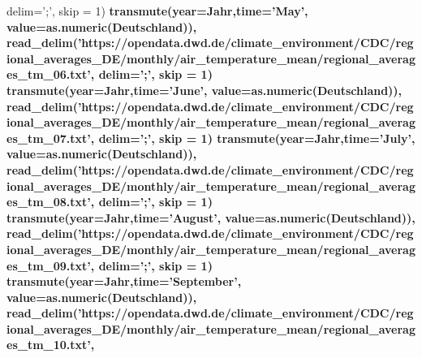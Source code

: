 \documentclass[
]{article}
\newenvironment{Shaded}{\begin{snugshade}}{\end{snugshade}}
\newcommand{\DataTypeTok}[1]{\textcolor[rgb]{0.13,0.29,0.53}{#1}}
\newcommand{\DecValTok}[1]{\textcolor[rgb]{0.00,0.00,0.81}{#1}}
\newcommand{\KeywordTok}[1]{\textcolor[rgb]{0.13,0.29,0.53}{\textbf{#1}}}
\newcommand{\NormalTok}[1]{#1}
\newcommand{\OperatorTok}[1]{\textcolor[rgb]{0.81,0.36,0.00}{\textbf{#1}}}
\newcommand{\StringTok}[1]{\textcolor[rgb]{0.31,0.60,0.02}{#1}}
\begin{document}
\begin{Shaded}
\begin{Highlighting}[]
{{{{{{{{{{               \DataTypeTok{delim=}\StringTok{';'}\NormalTok{, }\DataTypeTok{skip =} \DecValTok{1}\NormalTok{) }\OperatorTok{%
\StringTok{      }\KeywordTok{transmute}\NormalTok{(}\DataTypeTok{year=}\NormalTok{Jahr,}\DataTypeTok{time=}\StringTok{'May'}\NormalTok{, }\DataTypeTok{value=}\KeywordTok{as.numeric}\NormalTok{(Deutschland)),}
    \KeywordTok{read_delim}\NormalTok{(}\StringTok{'https://opendata.dwd.de/climate_environment/CDC/regional_averages_DE/monthly/air_temperature_mean/regional_averages_tm_06.txt'}\NormalTok{,}
               \DataTypeTok{delim=}\StringTok{';'}\NormalTok{, }\DataTypeTok{skip =} \DecValTok{1}\NormalTok{) }\OperatorTok{%
\StringTok{      }\KeywordTok{transmute}\NormalTok{(}\DataTypeTok{year=}\NormalTok{Jahr,}\DataTypeTok{time=}\StringTok{'June'}\NormalTok{, }\DataTypeTok{value=}\KeywordTok{as.numeric}\NormalTok{(Deutschland)),}
    \KeywordTok{read_delim}\NormalTok{(}\StringTok{'https://opendata.dwd.de/climate_environment/CDC/regional_averages_DE/monthly/air_temperature_mean/regional_averages_tm_07.txt'}\NormalTok{,}
               \DataTypeTok{delim=}\StringTok{';'}\NormalTok{, }\DataTypeTok{skip =} \DecValTok{1}\NormalTok{) }\OperatorTok{%
\StringTok{      }\KeywordTok{transmute}\NormalTok{(}\DataTypeTok{year=}\NormalTok{Jahr,}\DataTypeTok{time=}\StringTok{'July'}\NormalTok{, }\DataTypeTok{value=}\KeywordTok{as.numeric}\NormalTok{(Deutschland)),}
    \KeywordTok{read_delim}\NormalTok{(}\StringTok{'https://opendata.dwd.de/climate_environment/CDC/regional_averages_DE/monthly/air_temperature_mean/regional_averages_tm_08.txt'}\NormalTok{,}
               \DataTypeTok{delim=}\StringTok{';'}\NormalTok{, }\DataTypeTok{skip =} \DecValTok{1}\NormalTok{) }\OperatorTok{%
\StringTok{      }\KeywordTok{transmute}\NormalTok{(}\DataTypeTok{year=}\NormalTok{Jahr,}\DataTypeTok{time=}\StringTok{'August'}\NormalTok{, }\DataTypeTok{value=}\KeywordTok{as.numeric}\NormalTok{(Deutschland)),}
    \KeywordTok{read_delim}\NormalTok{(}\StringTok{'https://opendata.dwd.de/climate_environment/CDC/regional_averages_DE/monthly/air_temperature_mean/regional_averages_tm_09.txt'}\NormalTok{,}
               \DataTypeTok{delim=}\StringTok{';'}\NormalTok{, }\DataTypeTok{skip =} \DecValTok{1}\NormalTok{) }\OperatorTok{%
\StringTok{      }\KeywordTok{transmute}\NormalTok{(}\DataTypeTok{year=}\NormalTok{Jahr,}\DataTypeTok{time=}\StringTok{'September'}\NormalTok{, }\DataTypeTok{value=}\KeywordTok{as.numeric}\NormalTok{(Deutschland)),}
    \KeywordTok{read_delim}\NormalTok{(}\StringTok{'https://opendata.dwd.de/climate_environment/CDC/regional_averages_DE/monthly/air_temperature_mean/regional_averages_tm_10.txt'}\NormalTok{,}
}}}}}}}}}}}}}}}
\end{Highlighting}
\end{Shaded}
\end{document}
